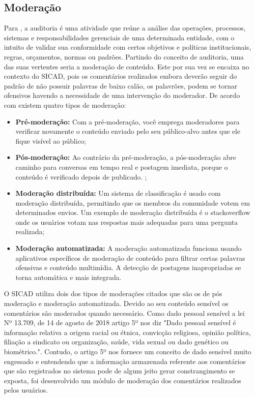 \documentclass[12pt, a4paper]{report}
\begin{document}
\subsection{Moderação}
\label{subsec:moderacao}
Para \citep{netosolanca2007}, a auditoria é uma atividade que reúne a análise das operações, processos, sistemas e responsabilidades gerenciais de uma determinada entidade, com o intuito de validar sua conformidade com certos objetivos e políticas institucionais, regras, orçamentos, normas ou padrões.
Partindo do conceito de auditoria, uma das suas vertentes seria a moderação de conteúdo. Este por sua vez se encaixa no contexto do SICAD, pois os comentários realizados embora deverão seguir do padrão de não possuir palavras de baixo calão, os palavrões, podem se tornar ofensivos havendo a necessidade de uma intervenção do moderador.
De acordo com \cite{SMITH2019} existem quatro tipos de moderação:
\begin{itemize}
\item \textbf {Pré-moderação: }Com a pré-moderação, você emprega moderadores para verificar novamente o conteúdo enviado pelo seu público-alvo antes que ele fique visível ao público; 
\item \textbf {Pós-moderação: }Ao contrário da pré-moderação, a pós-moderação abre caminho para conversas em tempo real e postagem imediata, porque o conteúdo é verificado depois de publicado. ;
\item \textbf {Moderação distribuída: }Um sistema de classificação é usado com moderação distribuída, permitindo que os membros da comunidade votem em determinados envios. Um exemplo de moderação distribuída é o stackoverflow onde os usuários votam nas respostas mais adequadas para uma pergunta realizada;
\item \textbf {Moderação automatizada: }A moderação automatizada funciona usando aplicativos específicos de moderação de conteúdo para filtrar certas palavras ofensivas e conteúdo multimídia. A detecção de postagens inapropriadas se torna automática e mais integrada. 
\end{itemize}

O SICAD utiliza dois dos tipos de moderações citados que são os de pós moderação e moderação automatizada. Devido ao seu conteúdo sensível os comentários são moderados quando necessário. Como dado pessoal sensível a lei Nº 13.709, de 14 de agosto de 2018 artigo 5º nos diz "Dado pessoal sensível é informação relativa a origem racial ou étnica, convicção religiosa, opinião política, filiação a sindicato ou organização, saúde, vida sexual ou dado genético ou biométrico.".  Contudo, o artigo 5º nos fornece um conceito de dado sensível muito engessado e entendendo que a informação armazenada referente aos comentários que são registrados no sistema pode de algum jeito gerar constrangimento se exposta, foi desenvolvido um módulo de moderação dos comentários realizados pelos usuários.
\end{document}
